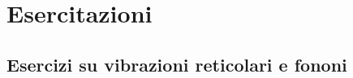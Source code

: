 \documentclass{book}
\begin{document}
 \chapter{Esercitazioni} 
    \section{Esercizi su vibrazioni reticolari e fononi}
        
\end{document}
